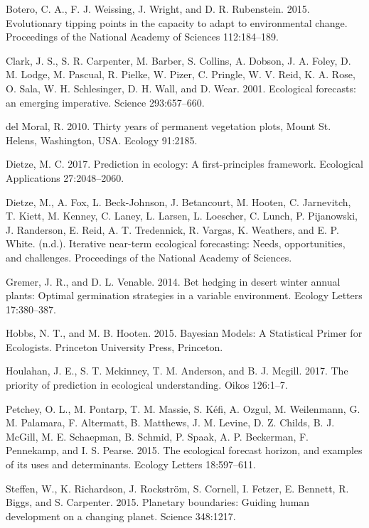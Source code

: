 \documentclass[12pt,]{article}
\begin{document}
\hypertarget{ref-Botero2015}{}
Botero, C. A., F. J. Weissing, J. Wright, and D. R. Rubenstein. 2015.
Evolutionary tipping points in the capacity to adapt to environmental
change. Proceedings of the National Academy of Sciences 112:184--189.

\hypertarget{ref-Clark2001}{}
Clark, J. S., S. R. Carpenter, M. Barber, S. Collins, A. Dobson, J. A.
Foley, D. M. Lodge, M. Pascual, R. Pielke, W. Pizer, C. Pringle, W. V.
Reid, K. A. Rose, O. Sala, W. H. Schlesinger, D. H. Wall, and D. Wear.
2001. Ecological forecasts: an emerging imperative. Science
293:657--660.

\hypertarget{ref-DelMoral2010}{}
{del Moral}, R. 2010. Thirty years of permanent vegetation plots, Mount
St. Helens, Washington, USA. Ecology 91:2185.

\hypertarget{ref-Dietze2017a}{}
Dietze, M. C. 2017. Prediction in ecology: A first-principles framework.
Ecological Applications 27:2048--2060.

\hypertarget{ref-Dietze2018}{}
Dietze, M., A. Fox, L. Beck-Johnson, J. Betancourt, M. Hooten, C.
Jarnevitch, T. Kiett, M. Kenney, C. Laney, L. Larsen, L. Loescher, C.
Lunch, P. Pijanowski, J. Randerson, E. Reid, A. T. Tredennick, R.
Vargas, K. Weathers, and E. P. White. (n.d.). Iterative near-term
ecological forecasting: Needs, opportunities, and challenges.
Proceedings of the National Academy of Sciences.

\hypertarget{ref-Gremer2014}{}
Gremer, J. R., and D. L. Venable. 2014. Bet hedging in desert winter
annual plants: Optimal germination strategies in a variable environment.
Ecology Letters 17:380--387.

\hypertarget{ref-Hobbs2015}{}
Hobbs, N. T., and M. B. Hooten. 2015. Bayesian Models: A Statistical
Primer for Ecologists. Princeton University Press, Princeton.

\hypertarget{ref-Houlahan2017}{}
Houlahan, J. E., S. T. Mckinney, T. M. Anderson, and B. J. Mcgill. 2017.
The priority of prediction in ecological understanding. Oikos 126:1--7.

\hypertarget{ref-Petchey2015}{}
Petchey, O. L., M. Pontarp, T. M. Massie, S. Kéfi, A. Ozgul, M.
Weilenmann, G. M. Palamara, F. Altermatt, B. Matthews, J. M. Levine, D.
Z. Childs, B. J. McGill, M. E. Schaepman, B. Schmid, P. Spaak, A. P.
Beckerman, F. Pennekamp, and I. S. Pearse. 2015. The ecological forecast
horizon, and examples of its uses and determinants. Ecology Letters
18:597--611.

\hypertarget{ref-Steffen2015}{}
Steffen, W., K. Richardson, J. Rockström, S. Cornell, I. Fetzer, E.
Bennett, R. Biggs, and S. Carpenter. 2015. Planetary boundaries: Guiding
human development on a changing planet. Science 348:1217.
\end{document}
